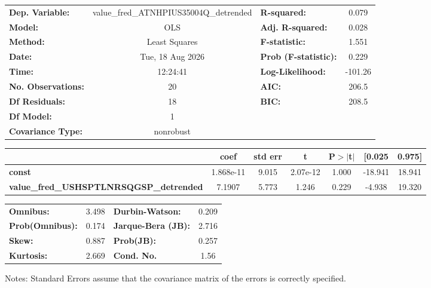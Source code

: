 \begin{center}
\begin{tabular}{lclc}
\toprule
\textbf{Dep. Variable:}                         & value\_fred\_ATNHPIUS35004Q\_detrended & \textbf{  R-squared:         } &     0.079   \\
\textbf{Model:}                                 &                  OLS                   & \textbf{  Adj. R-squared:    } &     0.028   \\
\textbf{Method:}                                &             Least Squares              & \textbf{  F-statistic:       } &     1.551   \\
\textbf{Date:}                                  &            Tue, 18 Aug 2026            & \textbf{  Prob (F-statistic):} &    0.229    \\
\textbf{Time:}                                  &                12:24:41                & \textbf{  Log-Likelihood:    } &   -101.26   \\
\textbf{No. Observations:}                      &                     20                 & \textbf{  AIC:               } &     206.5   \\
\textbf{Df Residuals:}                          &                     18                 & \textbf{  BIC:               } &     208.5   \\
\textbf{Df Model:}                              &                      1                 & \textbf{                     } &             \\
\textbf{Covariance Type:}                       &               nonrobust                & \textbf{                     } &             \\
\bottomrule
\end{tabular}
\begin{tabular}{lcccccc}
                                                & \textbf{coef} & \textbf{std err} & \textbf{t} & \textbf{P$> |$t$|$} & \textbf{[0.025} & \textbf{0.975]}  \\
\midrule
\textbf{const}                                  &    1.868e-11  &        9.015     &  2.07e-12  &         1.000        &      -18.941    &       18.941     \\
\textbf{value\_fred\_USHSPTLNRSQGSP\_detrended} &       7.1907  &        5.773     &     1.246  &         0.229        &       -4.938    &       19.320     \\
\bottomrule
\end{tabular}
\begin{tabular}{lclc}
\textbf{Omnibus:}       &  3.498 & \textbf{  Durbin-Watson:     } &    0.209  \\
\textbf{Prob(Omnibus):} &  0.174 & \textbf{  Jarque-Bera (JB):  } &    2.716  \\
\textbf{Skew:}          &  0.887 & \textbf{  Prob(JB):          } &    0.257  \\
\textbf{Kurtosis:}      &  2.669 & \textbf{  Cond. No.          } &     1.56  \\
\bottomrule
\end{tabular}
\end{center}

Notes: \newline
 [1] Standard Errors assume that the covariance matrix of the errors is correctly specified.